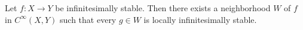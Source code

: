 %

\begin{proposition}
Let $f: X \to Y$ be infinitesimally stable.
Then there exists a neighborhood $W$ of $f$ in $C^\infty(X,Y)$ such that every $g \in W$ is locally infinitesimally stable.
\end{proposition}
